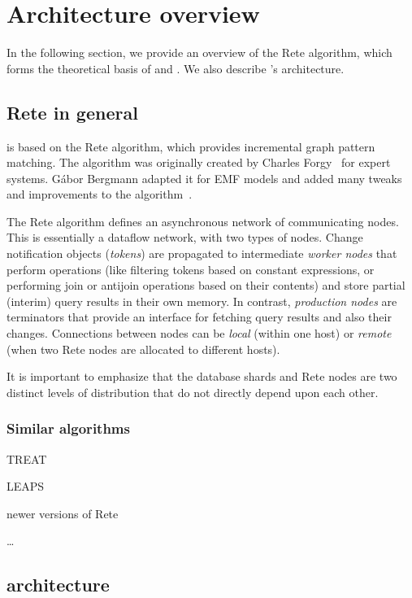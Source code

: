\section{Architecture overview}
\label{sec:architecture}

In the following section, we provide an overview of the Rete algorithm, which forms the theoretical basis of \eiq{} and \iqd{}. We also describe \iqd{}'s architecture.

\subsection{Rete in general}
\label{subsec:rete}

\iqd{} is based on the Rete algorithm, which provides incremental graph pattern matching. The algorithm was originally created by Charles Forgy~\cite{Forgy} for expert systems. Gábor Bergmann adapted it for EMF models and added many tweaks and improvements to the algorithm~\cite{BergmannRete}.

The Rete algorithm defines an asynchronous network of communicating nodes. This is essentially a dataflow network, with two types of nodes. Change notification objects (\emph{tokens}) are propagated to intermediate \emph{worker nodes} that perform operations (like filtering tokens based on constant expressions, or performing join or antijoin operations based on their contents) and store partial (interim) query results in their own memory. In contrast, \emph{production nodes} are terminators that provide an interface for fetching query results and also their changes. Connections between nodes can be \emph{local} (within one host) or \emph{remote} (when two Rete nodes are allocated to different hosts).

It is important to emphasize that the database shards and Rete nodes are two distinct levels of distribution that do not directly depend upon each other.

\subsubsection{Similar algorithms}

TREAT \cite{Miranker:1991:OPT:627280.627434} 

LEAPS \cite{Batory:1994:LA:899216}

newer versions of Rete

\ldots

\subsection{\iqd{} architecture}

